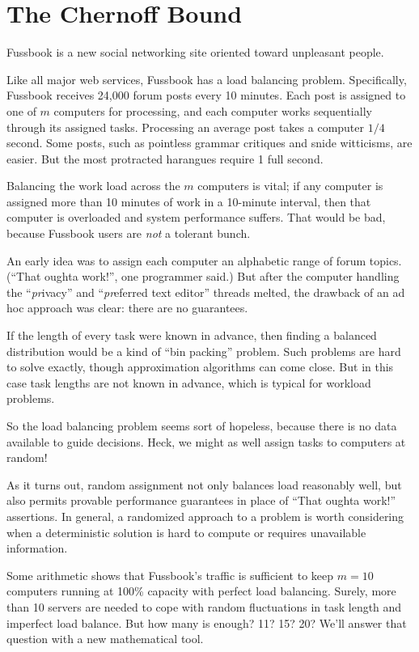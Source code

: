 \section{The Chernoff Bound}

Fussbook is a new social networking site oriented toward unpleasant
people.

Like all major web services, Fussbook has a load balancing problem.
Specifically, Fussbook receives 24,000 forum posts every 10 minutes.
Each post is assigned to one of $m$ computers for processing, and each
computer works sequentially through its assigned tasks.  Processing an
average post takes a computer $1/4$ second.  Some posts, such as
pointless grammar critiques and snide witticisms, are easier.  But the
most protracted harangues require 1 full second.

Balancing the work load across the $m$ computers is vital; if any
computer is assigned more than 10 minutes of work in a 10-minute
interval, then that computer is overloaded and system performance
suffers.  That would be bad, because Fussbook users are {\em not} a
tolerant bunch.

An early idea was to assign each computer an alphabetic range of forum
topics.  (``That oughta work!'', one programmer said.)  But after the
computer handling the ``{\em pr}ivacy'' and ``{\em pr}eferred text
editor'' threads melted, the drawback of an ad hoc approach was clear:
there are no guarantees.

If the length of every task were known in advance, then finding a
balanced distribution would be a kind of ``bin packing'' problem.
Such problems are hard to solve exactly, though approximation
algorithms can come close.  But in this case task lengths are not
known in advance, which is typical for workload problems.

So the load balancing problem seems sort of hopeless, because there is
no data available to guide decisions.  Heck, we might as well assign
tasks to computers at random!

As it turns out, random assignment not only balances load reasonably
well, but also permits provable performance guarantees in place of
``That oughta work!''  assertions.  In general, a randomized approach
to a problem is worth considering when a deterministic solution is
hard to compute or requires unavailable information.

Some arithmetic shows that Fussbook's traffic is sufficient to keep $m
= 10$ computers running at 100\% capacity with perfect load balancing.
Surely, more than 10 servers are needed to cope with random
fluctuations in task length and imperfect load balance.  But how many
is enough?  11?  15?  20?  We'll answer that question with a new
mathematical tool.

